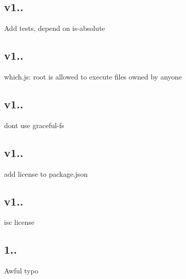 \subsection*{v1..}


\begin{DoxyItemize}
\item Add tests, depend on is-\/absolute
\end{DoxyItemize}

\subsection*{v1..}


\begin{DoxyItemize}
\item which.\+js\+: root is allowed to execute files owned by anyone
\end{DoxyItemize}

\subsection*{v1..}


\begin{DoxyItemize}
\item don\textquotesingle{}t use graceful-\/fs
\end{DoxyItemize}

\subsection*{v1..}


\begin{DoxyItemize}
\item add license to package.\+json
\end{DoxyItemize}

\subsection*{v1..}


\begin{DoxyItemize}
\item isc license
\end{DoxyItemize}

\subsection*{1..}


\begin{DoxyItemize}
\item Awful typo
\end{DoxyItemize}

